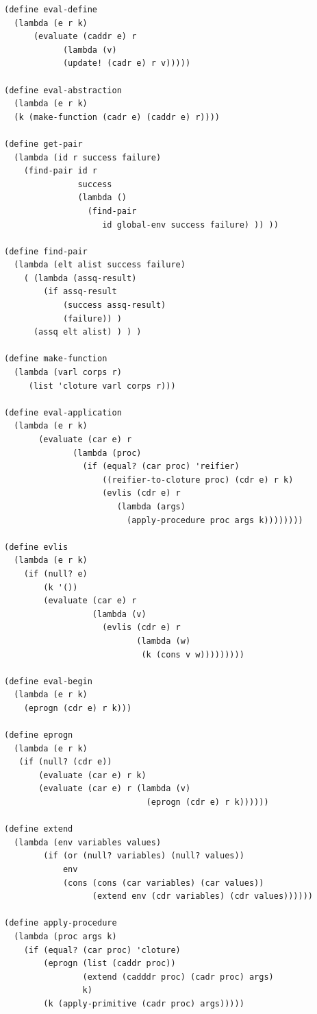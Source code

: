 \documentclass[11pt]{book}
\begin{document}
\begin{footnotesize}
\begin{Verbatim}
(define eval-define
  (lambda (e r k)
      (evaluate (caddr e) r
			(lambda (v) 
			(update! (cadr e) r v))))) 

(define eval-abstraction
  (lambda (e r k)
  (k (make-function (cadr e) (caddr e) r))))
					
(define get-pair
  (lambda (id r success failure)
    (find-pair id r
               success
               (lambda ()
                 (find-pair
                    id global-env success failure) )) ))

(define find-pair
  (lambda (elt alist success failure)
    ( (lambda (assq-result)
        (if assq-result
            (success assq-result)
            (failure)) )
      (assq elt alist) ) ) )

(define make-function
  (lambda (varl corps r)
     (list 'cloture varl corps r)))

(define eval-application
  (lambda (e r k)
       (evaluate (car e) r
              (lambda (proc)
                (if (equal? (car proc) 'reifier)
                    ((reifier-to-cloture proc) (cdr e) r k)
                    (evlis (cdr e) r
                       (lambda (args)
                         (apply-procedure proc args k))))))))

(define evlis
  (lambda (e r k)
    (if (null? e)
        (k '())
        (evaluate (car e) r
                  (lambda (v)
                    (evlis (cdr e) r
                           (lambda (w)
                            (k (cons v w)))))))))

(define eval-begin
  (lambda (e r k)
    (eprogn (cdr e) r k)))

(define eprogn
  (lambda (e r k)
   (if (null? (cdr e))
       (evaluate (car e) r k)
       (evaluate (car e) r (lambda (v)
                             (eprogn (cdr e) r k))))))

(define extend
  (lambda (env variables values)
        (if (or (null? variables) (null? values))
            env
            (cons (cons (car variables) (car values))
                  (extend env (cdr variables) (cdr values))))))
         
(define apply-procedure
  (lambda (proc args k)
    (if (equal? (car proc) 'cloture)
        (eprogn (list (caddr proc))
                (extend (cadddr proc) (cadr proc) args)
                k)
        (k (apply-primitive (cadr proc) args))))) 


\end{Verbatim}
\end{footnotesize}
\end{document}
